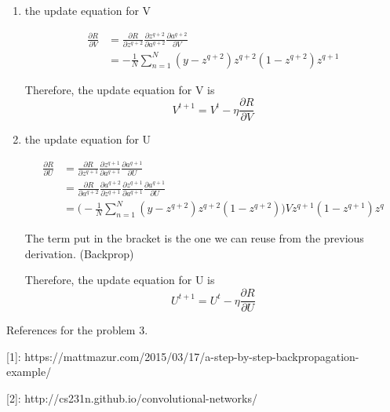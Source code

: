 \documentclass[11pt]{article}
\theoremstyle{definition}
\begin{document}
\begin{enumerate}
\item the update equation for V

\begin{equation*}
\begin{split}
\frac{\partial R}{\partial V} & = \frac{\partial R}{\partial z^{q+2}}
				\frac{\partial z^{q+2}} {\partial a^{q+2}}
				\frac{\partial a^{q+2}} {\partial V} \\
				& = - \frac{1}{N} \sum_{n=1}^{N} (y - z^{q+2})
					z^{q+2}(1-z^{q+2}) z^{q+1}
\end{split}
\end{equation*}

Therefore, the update equation for V is
\begin{equation*}
V^{t+1} = V^t - \eta \frac{\partial R}{\partial V}
\end{equation*}

\item the update equation for U

\begin{equation*}
\begin{split}
\frac{\partial R}{\partial U} & = \frac{\partial R}{\partial z^{q+1}}
				\frac{\partial z^{q+1}} {\partial a^{q+1}}
				\frac{\partial a^{q+1}} {\partial U} \\
				& = \frac{\partial R}{\partial a^{q+2}}
				\frac{\partial a^{q+2}} {\partial z^{q+1}}
				\frac{\partial z^{q+1}} {\partial a^{q+1}}
				\frac{\partial a^{q+1}} {\partial U} \\
				& = \bigg( - \frac{1}{N} \sum_{n=1}^{N} (y - z^{q+2})
					z^{q+2}(1-z^{q+2}) \bigg)
					V
					z^{q+1}(1-z^{q+1}) z^q
\end{split}
\end{equation*}

The term put in the bracket is the one we can reuse from the previous derivation. (Backprop)

Therefore, the update equation for U is
\begin{equation*}
U^{t+1} = U^t - \eta \frac{\partial R}{\partial U}
\end{equation*}
\end{enumerate}


\bigskip
References for the problem 3.

[1]: https://mattmazur.com/2015/03/17/a-step-by-step-backpropagation-example/

[2]: http://cs231n.github.io/convolutional-networks/
\end{document}
